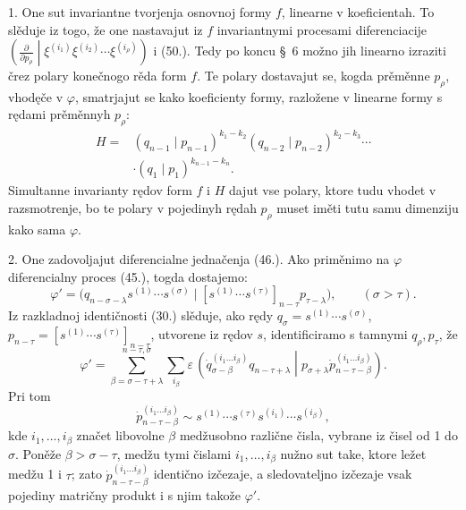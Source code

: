 \documentclass[11pt]{article}
\newcommand{\pair}[2]{\left(#1\middle|#2\right)}
\newcommand{\eps}{\varepsilon}
\begin{document}
1. One sut invariantne tvorjenja osnovnoj formy $f$, linearne v koeficientah. To slěduje iz togo, že one nastavajut iz $f$ invariantnymi procesami diferenciacije
$\left(\frac{\partial}{\partial p_\rho}\middle|\xi^{(i_1)}\xi^{(i_2)}\cdots\xi^{(i_\rho)}\right)$ i (50.). Tedy po koncu \S\ 6 možno jih linearno izraziti črez polary konečnogo rěda form $f$. Te polary dostavajut se, kogda prěměnne $p_\rho$, vhodęče v $\varphi$, smatrjajut se kako koeficienty formy, razložene v linearne formy s rędami prěměnnyh $p_\rho$:
\begin{equation}
\begin{aligned}
 H={}&(q_{n-1}\mid p_{n-1})^{k_1-k_2}
(q_{n-2}\mid p_{n-2})^{k_2-k_3}\cdots\\
&\cdot(q_1\mid p_1)^{k_{n-1}-k_n}.
\end{aligned}
\tag{52}
\end{equation}
Simultanne invarianty rędov form $f$ i $H$ dajut vse polary, ktore tudu vhodet v razsmotrenje, bo te polary v pojedinyh rędah $p_\rho$ muset iměti tutu samu dimenziju kako sama $\varphi$.

2. One zadovoljajut diferencialne jednačenja (46.). Ako priměnimo na $\varphi$ diferencialny proces (45.), togda dostajemo:
\[
 \varphi'=\bigl(q_{n-\sigma-\lambda}s^{(1)}\cdots s^{(\sigma)}\mid [s^{(1)}\cdots s^{(\tau)}]_{n-\tau}p_{\tau-\lambda}\bigr),\qquad (\sigma>\tau).
\]
Iz razkladnoj identičnosti (30.) slěduje, ako rędy $q_\sigma=s^{(1)}\cdots s^{(\sigma)}$, $p_{n-\tau}=[s^{(1)}\cdots s^{(\tau)}]_{n-\tau}$, utvorene iz rędov $s$, identificiramo s tamnymi $q_\rho,p_\tau$, že
\[
 \varphi'=\sum_{\beta=\sigma-\tau+\lambda}^{n-\tau,\sigma}\sum_{i_\beta}\eps\,
 \pair{\dot{q}_{\sigma-\beta}^{(i_1\ldots i_\beta)}q_{n-\tau+\lambda}}{p_{\sigma+\lambda}\dot{p}_{n-\tau-\beta}^{(i_1\ldots i_\beta)}}.
\]
Pri tom
\[
 \dot{p}_{n-\tau-\beta}^{(i_1\ldots i_\beta)}\sim s^{(1)}\cdots s^{(\tau)}s^{(i_1)}\cdots s^{(i_\beta)},
\]
kde $i_1,\ldots,i_\beta$ značet libovolne $\beta$ medžusobno različne čisla, vybrane iz čisel od 1 do $\sigma$. Poněže $\beta>\sigma-\tau$, medžu tymi čislami $i_1,\ldots,i_\beta$ nužno sut take, ktore ležet medžu 1 i $\tau$; zato $\dot{p}_{n-\tau-\beta}^{(i_1\ldots i_\beta)}$ identično izčezaje, a sledovateljno izčezaje vsak pojediny matričny produkt i s njim takože $\varphi'$.
\end{document}
